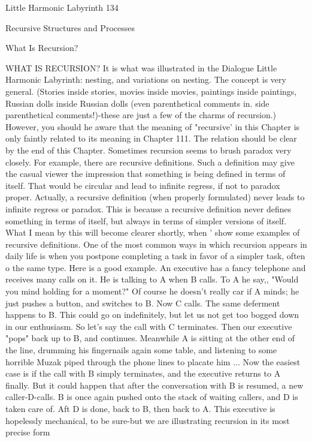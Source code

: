 Little Harmonic Labyrinth                                                        134

                          Recursive Structures
                             and Processes

                                What Is Recursion?

WHAT IS RECURSION? It is what was illustrated in the Dialogue Little Harmonic
Labyrinth: nesting, and variations on nesting. The concept is very general. (Stories inside
stories, movies inside movies, paintings inside paintings, Russian dolls inside Russian
dolls (even parenthetical comments in. side parenthetical comments!)-these are just a few
of the charms of recursion.) However, you should he aware that the meaning of
"recursive' in this Chapter is only faintly related to its meaning in Chapter 111. The
relation should be clear by the end of this Chapter.
        Sometimes recursion seems to brush paradox very closely. For example, there are
recursive definitions. Such a definition may give the casual viewer the impression that
something is being defined in terms of itself. That would be circular and lead to infinite
regress, if not to paradox proper. Actually, a recursive definition (when properly
formulated) never leads to infinite regress or paradox. This is because a recursive
definition never defines something in terms of itself, but always in terms of simpler
versions of itself. What I mean by this will become clearer shortly, when ' show some
examples of recursive definitions.
        One of the most common ways in which recursion appears in daily life is when
you postpone completing a task in favor of a simpler task, often o the same type. Here is
a good example. An executive has a fancy telephone and receives many calls on it. He is
talking to A when B calls. To A he say,, "Would you mind holding for a moment?" Of
course he doesn't really car if A minds; he just pushes a button, and switches to B. Now C
calls. The same deferment happens to B. This could go on indefinitely, but let us not get
too bogged down in our enthusiasm. So let's say the call with C terminates. Then our
executive "pops" back up to B, and continues. Meanwhile A is sitting at the other end of
the line, drumming his fingernails again some table, and listening to some horrible
Muzak piped through the phone lines to placate him ... Now the easiest case is if the call
with B simply terminates, and the executive returns to A finally. But it could happen that
after the conversation with B is resumed, a new caller-D-calls. B is once again pushed
onto the stack of waiting callers, and D is taken care of. Aft D is done, back to B, then
back to A. This executive is hopelessly mechanical, to be sure-but we are illustrating
recursion in its most precise form




